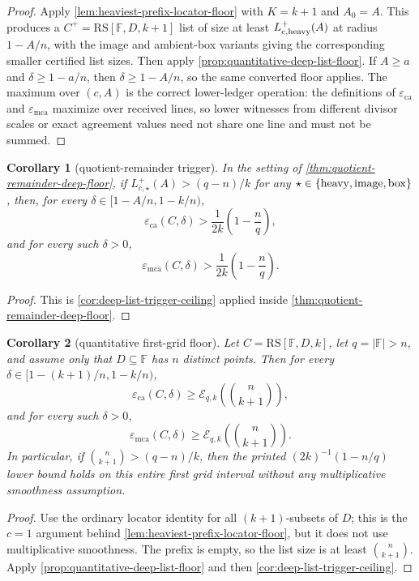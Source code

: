 \documentclass[11pt]{article}
\newtheorem{corollary}[corollary]{Corollary}
\theoremstyle{definition}
\theoremstyle{remark}
\newcommand{\F}{\mathbb{F}}
\newcommand{\RS}{\mathrm{RS}}
\newcommand{\eca}{\varepsilon_{\mathrm{ca}}}
\newcommand{\emca}{\varepsilon_{\mathrm{mca}}}
\begin{document}
\begin{proof}
Apply \cref{lem:heaviest-prefix-locator-floor} with $K=k+1$ and $A_0=A$.  This
produces a $C^+=\RS[\F,D,k+1]$ list of size at least
$L_{c,{\rm heavy}}^+(A)$ at radius $1-A/n$, with the image and ambient-box
variants giving the corresponding smaller certified list sizes.  Then apply
\cref{prop:quantitative-deep-list-floor}.  If $A\ge a$ and
$\delta\ge1-a/n$, then $\delta\ge1-A/n$, so the same converted floor applies.
The maximum over $(c,A)$ is the correct lower-ledger operation: the definitions
of $\eca$ and $\emca$ maximize over received lines, so lower witnesses from
different divisor scales or exact agreement values need not share one line and
must not be summed.
\end{proof}

\begin{corollary}[quotient-remainder trigger]
\label{cor:quotient-remainder-trigger}
In the setting of \cref{thm:quotient-remainder-deep-floor}, if
$L_{c,\star}^+(A)>(q-n)/k$ for any
$\star\in\{{\rm heavy},{\rm image},{\rm box}\}$, then, for every
$\delta\in[1-A/n,1-k/n)$,
\[
        \eca(C,\delta)>
        \frac1{2k}\left(1-\frac nq\right),
\]
and for every such $\delta>0$,
\[
        \emca(C,\delta)>
        \frac1{2k}\left(1-\frac nq\right).
\]
\end{corollary}

\begin{proof}
This is \cref{cor:deep-list-trigger-ceiling} applied inside
\cref{thm:quotient-remainder-deep-floor}.
\end{proof}

\begin{corollary}[quantitative first-grid floor]
\label{cor:quantitative-first-grid-floor}
Let $C=\RS[\F,D,k]$, let $q=|\F|>n$, and assume only that $D\subseteq\F$ has
$n$ distinct points.  Then for every
$\delta\in[1-(k+1)/n,1-k/n)$,
\[
        \eca(C,\delta)
        \ge
        \mathcal E_{q,k}\left(\binom n{k+1}\right),
\]
and for every such $\delta>0$,
\[
        \emca(C,\delta)
        \ge
        \mathcal E_{q,k}\left(\binom n{k+1}\right).
\]
In particular, if $\binom n{k+1}>(q-n)/k$, then the printed
$(2k)^{-1}(1-n/q)$ lower bound holds on this entire first grid interval without
any multiplicative smoothness assumption.
\end{corollary}

\begin{proof}
Use the ordinary locator identity for all $(k+1)$-subsets of $D$; this is the
$c=1$ argument behind \cref{lem:heaviest-prefix-locator-floor}, but it does not
use multiplicative smoothness.  The prefix is empty, so the list size is at
least
$\binom n{k+1}$.  Apply \cref{prop:quantitative-deep-list-floor} and then
\cref{cor:deep-list-trigger-ceiling}.
\end{proof}
\end{document}
